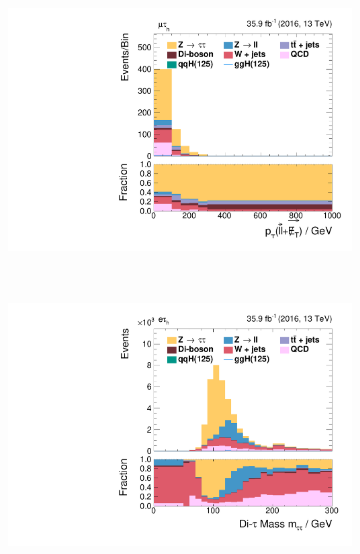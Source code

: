 \begin{figure}[h!]
\begin{subfigure}{.3\textwidth}
    \end{subfigure}%
    \begin{subfigure}{.3\textwidth}
        \centering
        \includegraphics[width=\textwidth]{Figures/eventselection/mt/BoostedCP/H_pt.pdf}
    \end{subfigure} \\ %
    \begin{subfigure}{.3\textwidth}
        \centering
        \includegraphics[width=\textwidth]{Figures/eventselection/et/ZeroJetCP/m_sv.pdf}
    \end{subfigure}%
    \begin{subfigure}{.3\textwidth}
        \centering

\end{subfigure}
\end{figure}
